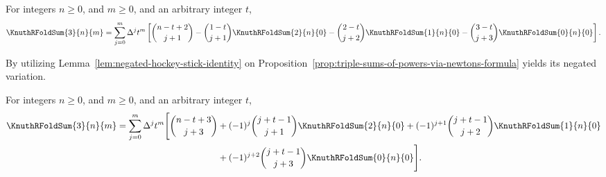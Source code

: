 \begin{proposition}
  \label{prop:triple-sums-of-powers-via-newtons-formula}
  For integers $n\geq 0$, and $m\geq 0$, and an arbitrary integer $t$,
  \begin{align*}
    \KnuthRFoldSum{3}{n}{m}
    = \sum_{j=0}^{m} \Delta^{j} t^m
    \left[ \binom{n-t+2}{j+1}
      - \binom{1-t}{j+1} \KnuthRFoldSum{2}{n}{0}
      - \binom{2-t}{j+2} \KnuthRFoldSum{1}{n}{0}
      - \binom{3-t}{j+3} \KnuthRFoldSum{0}{n}{0}
    \right].
  \end{align*}
\end{proposition}

By utilizing Lemma~\eqref{lem:negated-hockey-stick-identity}
on
Proposition~\eqref{prop:triple-sums-of-powers-via-newtons-formula}
yields its negated variation.
\begin{proposition}
  For integers $n\geq 0$, and $m\geq 0$, and an arbitrary integer $t$,
  \begin{align*}
    \KnuthRFoldSum{3}{n}{m} = \sum_{j=0}^{m} \Delta^{j} t^m
    \Bigg[ \binom{n-t+3}{j+3}
      &+ (-1)^{j} \binom{j+t-1}{j+1} \KnuthRFoldSum{2}{n}{0}
      + (-1)^{j+1} \binom{j+t-1}{j+2} \KnuthRFoldSum{1}{n}{0} \\
      &+ (-1)^{j+2} \binom{j+t-1}{j+3} \KnuthRFoldSum{0}{n}{0}
    \Bigg].
  \end{align*}
\end{proposition}

